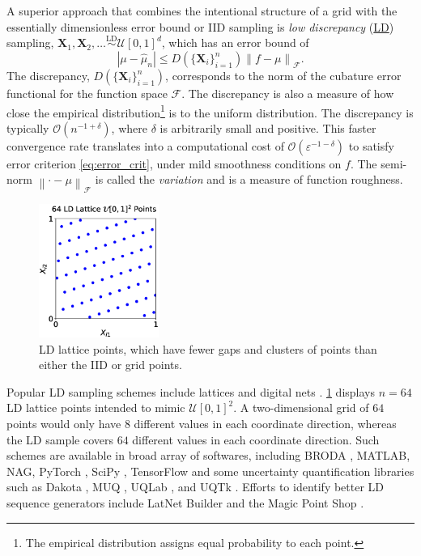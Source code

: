 \documentclass[11pt]{NSFamsart}
\newcommand{\LD}{\hyperlink{LDlink}{LD}\xspace}
\newcommand{\NAG}{NAG\xspace}
\newcommand{\MATLAB}{MATLAB\xspace}
\newcommand{\bX}{{\boldsymbol{X}}}
\newcommand{\calf}{{\mathcal{F}}}
\newcommand{\calu}{{\mathcal{U}}}
\def\abs#1{\ensuremath{\left \lvert #1 \right \rvert}}
\newcommand{\norm}[2][{}]{\ensuremath{\left \lVert #2 \right \rVert}_{#1}}
\newcommand{\Order}{\mathcal{O}}
\newcommand{\hmu}{\hat{\mu}}
\newcommand{\LDSim}{\overset{\text{LD}}{\sim}}
\begin{document}
A superior approach that combines the intentional structure of a grid with the essentially dimensionless error bound or IID sampling is \hypertarget{LDlink}{\emph{low discrepancy}} (\LD)  sampling, $\bX_1, \bX_2,  \ldots \LDSim \calu[0,1]^d$, which has an error bound of \cite{Nie92,Hic99a}
\begin{equation} \label{eq:KH}
 \abs{\mu - \hmu_n} \le D(\{\bX_i\}_{i=1}^n) \norm[\calf]{f - \mu}.
\end{equation}
The discrepancy,  $D(\{\bX_i\}_{i=1}^n)$, corresponds to the norm of the cubature error functional \cite{Hic97a} for the function space $\calf$.  The discrepancy is also a measure of how close the empirical distribution\footnote{The empirical distribution assigns equal probability to each point.} is to the uniform distribution. 
The discrepancy is typically $\Order(n^{-1 + \delta})$, where $\delta$ is arbitrarily small and positive. This faster convergence rate translates into a computational cost of $\Order(\varepsilon^{-1-\delta})$ to satisfy error criterion \eqref{eq:error_crit}, under mild smoothness conditions on $f$.  The semi-norm $\norm[\calf]{\cdot - \mu}$ is called the \emph{variation} and is a measure of function roughness. 

\begin{figure}
	\centering
	\includegraphics[width = 0.35\textwidth]{ProgramsImages/lattice_scatter.eps}
	\caption{LD lattice points, which have fewer gaps and clusters of points than either the IID or grid points. \label{fig:iid_vs_ld}}
\end{figure}

Popular LD sampling schemes include lattices \cite{Nie92,SloJoe94,DicEtal22a} and digital nets \cite{Nie92,DicPil10a}. \cref{fig:iid_vs_ld} displays $n=64$ LD lattice points intended to mimic $\calu[0,1]^2$.  A two-dimensional grid of $64$ points would only have $8$ different values in each coordinate direction, whereas the LD sample covers $64$ different values in each coordinate direction. Such schemes are available in broad array of softwares, including BRODA \cite{BRODA20a}, \MATLAB \cite{MAT9.9}, \NAG \cite{NAG27}, PyTorch \cite{paszke2019pytorch}, SciPy \cite{virtanen2020scipy}, TensorFlow \cite{tfqf2021a} and some uncertainty quantification libraries such as Dakota \cite{DakotaUsersManual}, MUQ \cite{MUQ}, UQLab \cite{UQLab2014}, and UQTk \cite{DebEtal04,UQTk}.  Efforts to identify better LD sequence generators include LatNet Builder \cite{LatNet} and the Magic Point Shop \cite{Nuy17a}. 
\end{document}
